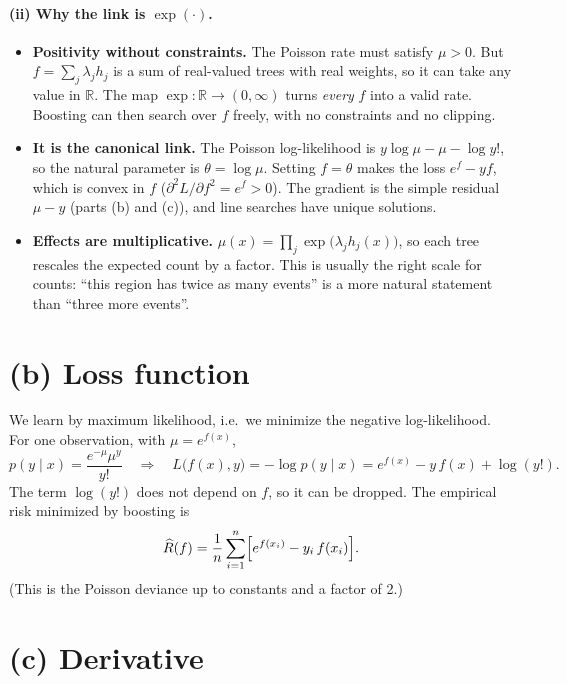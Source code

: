 \documentclass[11pt]{article}
\newcommand{\R}{\mathbb{R}}
\begin{document}
\paragraph{(ii) Why the link is $\exp(\cdot)$.}
\begin{itemize}
\item \textbf{Positivity without constraints.} The Poisson rate must satisfy $\mu>0$. But
$f=\sum_j\lambda_jh_j$ is a sum of real-valued trees with real weights, so it can take any value
in $\R$. The map $\exp:\R\to(0,\infty)$ turns \emph{every} $f$ into a valid rate. Boosting can
then search over $f$ freely, with no constraints and no clipping.
\item \textbf{It is the canonical link.} The Poisson log-likelihood is
$y\log\mu-\mu-\log y!$, so the natural parameter is $\theta=\log\mu$. Setting $f=\theta$ makes
the loss $e^{f}-yf$, which is convex in $f$ ($\partial^2L/\partial f^2=e^f>0$). The gradient is
the simple residual $\mu-y$ (parts (b) and (c)), and line searches have unique solutions.
\item \textbf{Effects are multiplicative.} $\mu(x)=\prod_j\exp\bigl(\lambda_jh_j(x)\bigr)$, so each
tree rescales the expected count by a factor. This is usually the right scale for counts:
``this region has twice as many events'' is a more natural statement than ``three more events''.
\end{itemize}

\section*{(b) Loss function}

We learn by maximum likelihood, i.e.\ we minimize the negative log-likelihood. For one observation,
with $\mu=e^{f(x)}$,
\[
p(y\mid x)=\frac{e^{-\mu}\mu^{y}}{y!}
\quad\Longrightarrow\quad
L\bigl(f(x),y\bigr)=-\log p(y\mid x)=e^{f(x)}-y\,f(x)+\log(y!) .
\]
The term $\log(y!)$ does not depend on $f$, so it can be dropped. The empirical risk minimized by
boosting is
\[
\widehat R(f)=\frac1n\sum_{i=1}^n\Bigl[e^{f(x_i)}-y_i\,f(x_i)\Bigr].
\]
(This is the Poisson deviance up to constants and a factor of 2.)

\section*{(c) Derivative}
\end{document}
